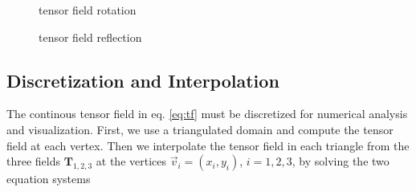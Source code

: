 \documentclass[a4paper,10pt,notitlepage]{scrartcl}
\newcommand{\mat}[1]{\mathbf{#1}}
\begin{document}
\begin{figure}
  \caption{tensor field rotation}
  \label{fig:tfd-rotation}
\end{figure}

\begin{figure}
  \centering
  \caption{tensor field reflection}
  \label{fig:tfd-reflection}
\end{figure}

\subsection{Discretization and Interpolation}

The continous tensor field in eq. \ref{eq:tf} must be discretized for numerical
analysis and visualization. First, we use a triangulated domain and compute the
tensor field at each vertex. Then we interpolate the tensor field in each
triangle from the three fields  $\mat{T}_{1,2,3}$ at the vertices
$\vec{v}_{i} = (x_i,y_i)$, $i = 1,2,3$, by solving the two equation systems
\end{document}
